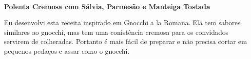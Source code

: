 \documentclass[11pt,letterpaper]{article}
\date{}
\begin{document}
\setcounter{page}{1}

\vspace{2.0in}
\ \newline
\ \newline
\begin{centering}
{\bf \Large Polenta Cremosa com S\'alvia, Parmes\~ao e Manteiga Tostada}\\
\end{centering}
\vspace{0.5in}

Eu desenvolvi esta receita inspirado em Gnocchi a la Romana. Ela tem sabores similares ao gnocchi, mas tem uma conist\^encia cremosa para os convidados servirem de colheradas. Portanto \'e mais f\'acil de preparar e n\~ao precisa cortar em pequenos peda\c{c}os e assar como o gnocchi.
 
\end{document}
